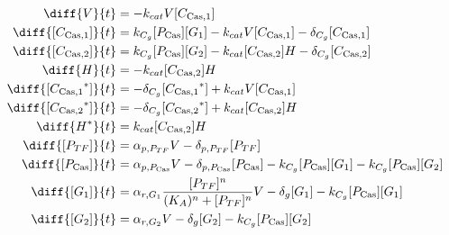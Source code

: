 \begin{align}
\diff{\vectorGen{}}{t} & = - \casCutRate{{}}\vectorGen{}\conc{\cplx{\cas}{1}}\\ 
\diff{\conc{\cplx{\cas}{1}}}{t} & =  \gRnaBind{}\conc{\proSp{\cas{}}}\conc{\gRna{1}} - \casCutRate{{}}\vectorGen{}\conc{\cplx{\cas}{1}} - \casCompDegradeRate{}\conc{\cplx{\cas}{1}}\\ 
\diff{\conc{\cplx{\cas}{2}}}{t} & =  \gRnaBind{}\conc{\proSp{\cas{}}}\conc{\gRna{2}} - \casCutRate{{}}\conc{\cplx{\cas}{2}}\hostGen{} - \casCompDegradeRate{}\conc{\cplx{\cas}{2}}\\ 
\diff{\hostGen{}}{t} & = - \casCutRate{{}}\conc{\cplx{\cas}{2}}\hostGen{}\\ 
\diff{\conc{\bound{\cplx{\cas}{1}}}}{t} & = - \casCompDegradeRate{}\conc{\bound{\cplx{\cas}{1}}} + \casCutRate{{}}\vectorGen{}\conc{\cplx{\cas}{1}}\\ 
\diff{\conc{\bound{\cplx{\cas}{2}}}}{t} & = - \casCompDegradeRate{}\conc{\bound{\cplx{\cas}{2}}} + \casCutRate{{}}\conc{\cplx{\cas}{2}}\hostGen{}\\ 
\diff{\edited{\hostGen{}}}{t} & =  \casCutRate{{}}\conc{\cplx{\cas}{2}}\hostGen{}\\ 
\diff{\conc{\proSp{TF}}}{t} & =  \txtlRate{\proSp{TF}}\vectorGen{} - \proDegradeRate{\proSp{TF}}\conc{\proSp{TF}}\\ 
\diff{\conc{\proSp{\cas{}}}}{t} & =  \txtlRate{\proSp{\cas{}}}\vectorGen{} - \proDegradeRate{\proSp{\cas{}}}\conc{\proSp{\cas{}}} - \gRnaBind{}\conc{\proSp{\cas{}}}\conc{\gRna{1}} - \gRnaBind{}\conc{\proSp{\cas{}}}\conc{\gRna{2}}\\ 
\diff{\conc{\gRna{1}}}{t} & =  \txRate{\gRna{1}}\frac{[\proSp{TF}]^n}{(K_A)^n + [\proSp{TF}]^n}\vectorGen{} - \rnaDegradeRate{}\conc{\gRna{1}} - \gRnaBind{}\conc{\proSp{\cas{}}}\conc{\gRna{1}}\\ 
\diff{\conc{\gRna{2}}}{t} & =  \txRate{\gRna{2}}\vectorGen{} - \rnaDegradeRate{}\conc{\gRna{2}} - \gRnaBind{}\conc{\proSp{\cas{}}}\conc{\gRna{2}}
\end{align}

